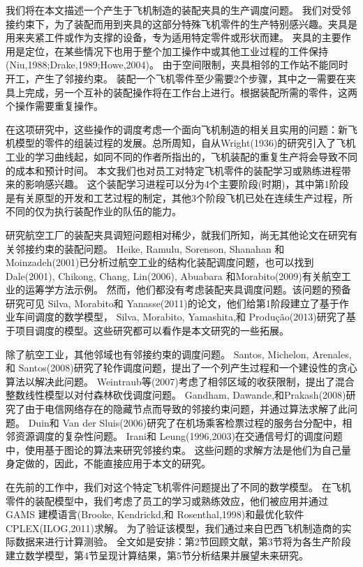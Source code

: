 我们将在本文描述一个产生于飞机制造的装配夹具的生产调度问题。
我们对受邻接约束下，为了装配而用到夹具的这部分特殊飞机零件的生产特别感兴趣。夹具是用来夹紧工件或作为支撑的设备，专为适用特定零件或形状而建。
夹具的主要作用是定位，在某些情况下也用于整个加工操作中或其他工业过程的工件保持(Niu,1988;Drake,1989;Howe,2004)。
由于空间限制，夹具相邻的工作站不能同时开工，产生了邻接约束。
装配一个飞机零件至少需要2个步骤，其中之一需要在夹具上完成，另一个互补的装配操作将在工作台上进行。根据装配所需的零件，这两个操作需要重复操作。

在这项研究中，这些操作的调度考虑一个面向飞机制造的相关且实用的问题：新飞机模型的零件的组装过程的发展。总所周知，自从Wright(1936)的研究引入了飞机工业的学习曲线起，如同不同的作者所指出的，飞机装配的重复生产将会导致不同的成本和预计时间。
本文我们也对员工对特定飞机零件的装配学习或熟练进程带来的影响感兴趣。
这个装配学习进程可以分为4个主要阶段(时期)，其中第1阶段是有关原型的开发和工艺过程的制定，其他3个阶段飞机已处在连续生产过程，所不同的仅为执行装配作业的队伍的能力。

研究航空工厂的装配夹具调短问题相对稀少，就我们所知，尚无其他论文在研究有关邻接约束的装配问题。
Heike, Ramulu, Sorenson, Shanahan 和Moinzadeh(2001)已分析过航空工业的结构化装配调度问题，也可以找到 Dale(2001), Chikong, Chang, Lin(2006), Abuabara 和Morabito(2009)有关航空工业的运筹学方法示例。
然而，他们都没有考虑装配夹具调度问题。该问题的预备研究可见 Silva, Morabito和 Yanasse(2011)的论文，他们给第1阶段建立了基于作业车间调度的数学模型， Silva, Morabito, Yamashita,和 Produção(2013)研究了基于项目调度的模型。这些研究都可以看作是本文研究的一些拓展。

除了航空工业，其他邻域也有邻接约束的调度问题。 Santos, Michelon, Arenales,和 Santos(2008)研究了轮作调度问题，提出了一个列产生过程和一个建设性的贪心算法以解决此问题。
Weintraub等(2007)考虑了相邻区域的收获限制，提出了混合整数线性模型以对付森林砍伐调度问题。
Gandham, Dawande,和Prakash(2008)研究了由于电信网络存在的隐藏节点而导致的邻接约束问题，并通过算法求解了此问题。
Duin和 Van der Sluis(2006)研究了在机场乘客检票过程的服务台分配中，相邻资源调度的复杂性问题。
Irani和 Leung(1996,2003)在交通信号灯的调度问题中，使用基于图论的算法来研究邻接约束。
这些问题的求解方法是他们为自己量身定做的，因此，不能直接应用于本文的研究。

在先前的工作中，我们对这个特定飞机零件问题提出了不同的数学模型。
在飞机零件的装配模型中，我们考虑了员工的学习或熟练效应，他们被应用并通过GAMS 建模语言(Brooke, Kendrickd,和 Rosenthal,1998)和最优化软件CPLEX(ILOG,2011)求解。
为了验证该模型，我们通过来自巴西飞机制造商的实际数据来进行计算测验。
全文如是安排：第2节回顾文献，第3节将为各生产阶段建立数学模型，第4节呈现计算结果，第5节分析结果并展望未来研究。

